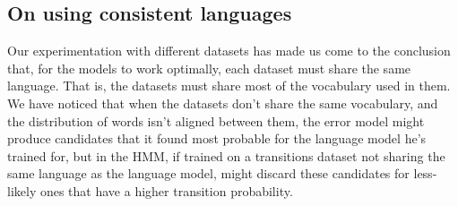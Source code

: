 {\subsection{On using consistent languages}
Our experimentation with different datasets has made us come to the conclusion that, for the models to work 
optimally, each dataset must share the same language. That is, the datasets must share most of the vocabulary 
used in them. We have noticed that when the datasets don't share the same vocabulary, and the distribution of 
words isn't aligned between them, the error model might produce candidates that it found most probable for 
the language model he's trained for, but in the HMM, if trained on a transitions dataset not sharing the same 
language as the language model, might discard these candidates for less-likely ones that have a higher 
transition probability.



}
